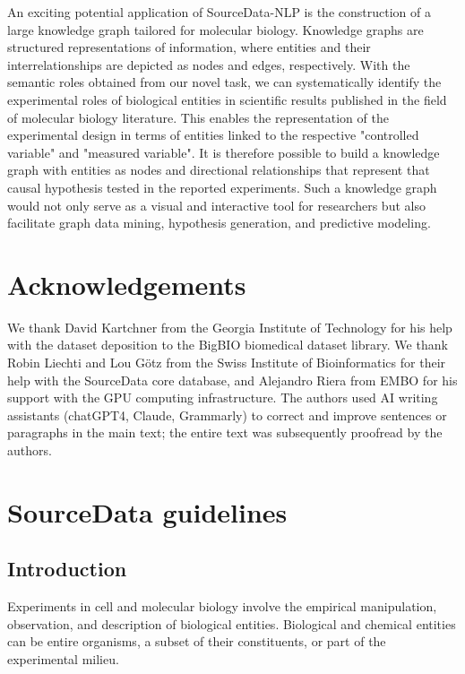 \documentclass{bioinfo}
\begin{document}
An exciting potential application of SourceData-NLP is the construction of a large knowledge graph tailored for molecular biology. Knowledge graphs are structured representations of information, where entities and their interrelationships are depicted as nodes and edges, respectively. With the semantic roles obtained from our novel task, we can systematically identify the experimental roles of biological entities in scientific results published in the field of molecular biology literature. This enables the representation of the experimental design in terms of entities linked to the respective "controlled variable" and "measured variable". It is therefore possible to build a knowledge graph with entities as nodes and directional relationships that represent that causal hypothesis tested in the reported experiments. Such a knowledge graph would not only serve as a visual and interactive tool for researchers but also facilitate graph data mining, hypothesis generation, and predictive modeling.

\section*{Acknowledgements}

We thank David Kartchner from the Georgia Institute of Technology for his help with the dataset deposition to the BigBIO biomedical dataset library. We thank Robin Liechti and Lou Götz from the Swiss Institute of Bioinformatics for their help with the SourceData core database, and Alejandro Riera from EMBO for his support with the GPU computing infrastructure. The authors used AI writing assistants (chatGPT4, Claude, Grammarly) to correct and improve sentences or paragraphs in the main text; the entire text was subsequently proofread by the authors.







\newpage
\appendix
\renewcommand{\thesection}{\Alph{section}}
\section{SourceData guidelines\label{app:guidelines}}
\subsection{Introduction}\label{app:introduction}

Experiments in cell and molecular biology involve the empirical manipulation, observation, and description of biological entities. Biological and chemical entities can be entire organisms, a subset of their constituents, or part of the experimental milieu.
\end{document}
